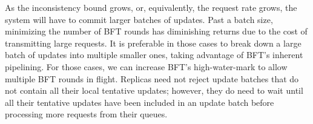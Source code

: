 \documentclass[twocolumn,10pt]{article}
\begin{document}
{As the inconsistency bound grows, or, equivalently, the request rate
grows, the system will have to commit larger batches of updates.  Past a
batch size, minimizing the number of BFT rounds has diminishing returns
due to the cost of transmitting large requests.  It is preferable in
those cases to break down a large batch of updates into multiple
smaller ones, taking advantage of BFT's inherent pipelining.    For
those cases, we can increase BFT's high-water-mark to allow multiple BFT
rounds in flight.  Replicas need not reject update batches that do not
contain all their local tentative updates; however, they do need to wait
until all their tentative updates have been included in an update batch
before processing more requests from their queues.
























































































}
\end{document}

